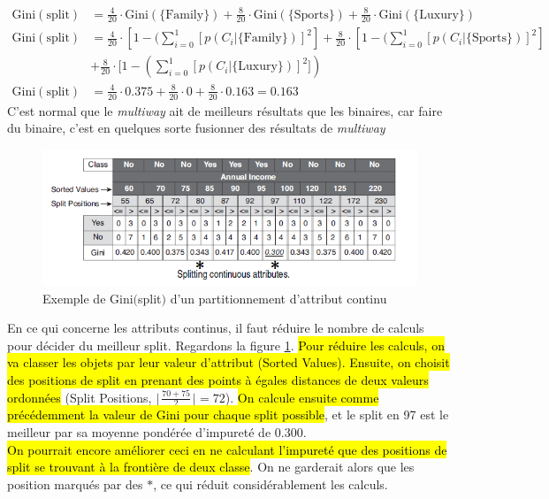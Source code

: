 \documentclass[letterpaper, 12pt]{article}
\newcommand{\alinea}{
\hspace*{0.5cm}}
\begin{document}
			\begin{align*}
				\text{Gini}(\text{split}) &= \frac{4}{20} \cdot 
					\text{Gini}(\{\text{Family}\}) + \frac{8}{20} \cdot 
					\text{Gini}(\{\text{Sports}\}) + \frac{8}{20} \cdot 
					\text{Gini}(\{\text{Luxury}\})\\
				\text{Gini}(\text{split}) &= 
				\frac{4}{20} \cdot 
				[1 - (\sum_{i=0}^{1}[p(C_i|\{\text{Family}\})]^2] + 
				\frac{8}{20} \cdot 
				[1 - (\sum_{i=0}^{1}[p(C_i|\{\text{Sports}\})]^2]\\ 
				&+ 
				\frac{8}{20} \cdot 
				[1 - (\sum_{i=0}^{1}[p(C_i|\{\text{Luxury}\})]^2])\\
				\text{Gini}(\text{split}) &= \frac{4}{20} \cdot 0.375
					 + \frac{8}{20} \cdot 0
					 + \frac{8}{20} \cdot 0.163 = 0.163
			\end{align*}
			C'est normal que le \textit{multiway} ait de meilleurs résultats
				que les binaires, car faire du binaire, c'est en quelques
				sorte fusionner	des résultats de \textit{multiway}\\	
			\begin{figure}[H]
				\centering
				\includegraphics[scale=1.0]{Images/tree_split_measure2.png}
				\caption{Exemple de Gini$($split$)$ d'un partitionnement
						 d'attribut continu}
				\label{fig:tree:split_measure2}
			\end{figure}\noindent
			\alinea En ce qui concerne les attributs continus, 
				il faut réduire 
				le nombre de calculs pour décider du meilleur split. 
				Regardons la figure \ref{fig:tree:split_measure2}.
				\hl{Pour réduire les calculs, on va classer les objets 
				par leur valeur d'attribut
				(Sorted Values). Ensuite, on choisit des positions de split
				en prenant des points à égales distances de deux 
				valeurs ordonnées} (Split Positions, 
				$\lfloor\frac{70 + 75}{2}\rfloor = 72$). \hl{On calcule 
				ensuite
				comme précédemment la valeur de Gini pour chaque split
				 possible},
				et le split en 97 est le meilleur par sa moyenne pondérée 
				d'impureté de 0.300.\\
			\alinea \hl{On pourrait encore améliorer ceci en ne calculant 
				l'impureté que des positions de split se trouvant à la
				frontière de deux classe}. On ne garderait alors que 
				les position marqués par des $\ast$, ce qui réduit 
				considérablement les calculs.
\end{document}
